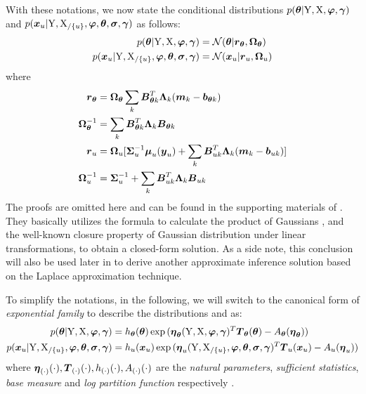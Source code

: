 With these notations, we now state the conditional distributions $p(\boldsymbol{\theta}\vert\mathrm{Y},\mathrm{X},\boldsymbol{\varphi},\boldsymbol{\gamma})$ and $p(\boldsymbol{x}_{u}\vert\mathrm{Y},\mathrm{X}_{/\{u\}},\boldsymbol{\varphi},\boldsymbol{\theta},\boldsymbol{\sigma},\boldsymbol{\gamma})$ as follows:
\begin{align}
    p(\boldsymbol{\theta}\vert\mathrm{Y},\mathrm{X},\boldsymbol{\varphi},\boldsymbol{\gamma})
    & = \mathcal{N}(\boldsymbol{\theta}\vert\boldsymbol{r}_{\boldsymbol{\theta}}, \boldsymbol{\Omega}_{\boldsymbol{\theta}})    
    \label{eq-vgmgp-theta-conditional}
    \\
    p(\boldsymbol{x}_{u}\vert\mathrm{Y},\mathrm{X}_{/\{u\}},\boldsymbol{\varphi},\boldsymbol{\theta},\boldsymbol{\sigma},\boldsymbol{\gamma})
    & = \mathcal{N}(\boldsymbol{x}_{u}\vert\boldsymbol{r}_{u}, \boldsymbol{\Omega}_{u})
    \label{eq-vgmgp-xu-conditional}
\end{align}
where 
\begin{align}
    \boldsymbol{r}_{\boldsymbol{\theta}} 
    & = \boldsymbol{\Omega}_{\boldsymbol{\theta}} \sum_k{\boldsymbol{B}_{\boldsymbol{\theta}{k}}^T\boldsymbol{\Lambda}_{k}(\boldsymbol{m}_{k} - \boldsymbol{b}_{\boldsymbol{\theta}{k}})}    
    \label{eq-vgmgp-theta-conditional-mean}
    \\
    \boldsymbol{\Omega}_{\boldsymbol{\theta}}^{-1}
    & = \sum_k{\boldsymbol{B}_{\boldsymbol{\theta}{k}}^T\boldsymbol{\Lambda}_{k}\boldsymbol{B}_{\boldsymbol{\theta}{k}}}
    \label{eq-vgmgp-theta-conditional-covariance}
    \\
    \boldsymbol{r}_{u}
    & = \boldsymbol{\Omega}_{u}[
        \boldsymbol{\Sigma}_{u}^{-1}\boldsymbol{\mu}_{u}(\boldsymbol{y}_{u})
        + \sum_k{
            \boldsymbol{B}_{u{k}}^T\boldsymbol{\Lambda}_{k}(\boldsymbol{m}_{k} - \boldsymbol{b}_{u{k}})}        
    ]
    \label{eq-vgmgp-xu-conditional-mean}
    \\
    \boldsymbol{\Omega}_{u}^{-1}
    & = \boldsymbol{\Sigma}_{u}^{-1} + \sum_k{
        \boldsymbol{B}_{u{k}}^T\boldsymbol{\Lambda}_{k}\boldsymbol{B}_{u{k}} 
    } 
    \label{eq-vgmgp-xu-conditional-covariance}
\end{align}
The proofs are omitted here and can be found in the supporting materials of \cite{gorbach2017scalable}.
They basically utilizes the formula to calculate the product of Gaussians \citep[]{petersen2012matrix}, and the well-known closure property of Gaussian distribution under linear transformations, to obtain a closed-form solution.
As a side note, this conclusion will also be used later in  to derive another approximate inference solution based on the Laplace approximation technique.

To simplify the notations, in the following, we will switch to the canonical form of \emph{exponential family} \citep[]{murphy2012machine} to describe the distributions  and  as:
\begin{align}
    p(\boldsymbol{\theta}\vert\mathrm{Y},\mathrm{X},\boldsymbol{\varphi},\boldsymbol{\gamma})
    & = h_{\boldsymbol{\theta}}(\boldsymbol{\theta}) \exp{(\boldsymbol{\eta}_{\boldsymbol{\theta}}(\mathrm{Y},\mathrm{X},\boldsymbol{\ensuremath{\varphi}},\boldsymbol{\gamma})^T\boldsymbol{T}_{\boldsymbol{\theta}}(\boldsymbol{\theta})- A_{\boldsymbol{\theta}}(\boldsymbol{\eta}_{\boldsymbol{\theta}}))}
    \label{eq-vgmgp-theta-conditional-canonical}
    \\
    p(\boldsymbol{x}_{u}\vert\mathrm{Y},\mathrm{X}_{/\{u\}},\boldsymbol{\varphi},\boldsymbol{\theta},\boldsymbol{\sigma},\boldsymbol{\gamma})
    & = h_{u}(\boldsymbol{x}_{u}) \exp{(\boldsymbol{\eta}_{u}(\mathrm{Y},\mathrm{X}_{/\{u\}},\boldsymbol{\ensuremath{\varphi}},\boldsymbol{\theta},\boldsymbol{\sigma},\boldsymbol{\gamma})^T\boldsymbol{T}_{u}(\boldsymbol{x}_{u})- A_{u}(\boldsymbol{\eta}_{u}))}
    \label{eq-vgmgp-xu-conditional-canonical}
\end{align}
where $\boldsymbol{\eta}_{(\cdot)}(\cdot), \boldsymbol{T}_{(\cdot)}(\cdot), h_{(\cdot)}(\cdot), A_{(\cdot)}(\cdot)$ are the \emph{natural parameters}, \emph{sufficient statistics},  \emph{base measure} and \emph{log partition function} respectively .

